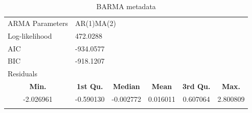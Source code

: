 \documentclass[12pt,a4paper,twoside]{article}
\begin{document}
\begin{longtable}{lccccc}
    \caption{BARMA metadata}\\
    \hline
    ARMA Parameters                   & \multicolumn{5}{l}{AR(1)MA(2)}                                                                     \\
    Log-likelihood                    & \multicolumn{5}{l}{472.0288}                                                                       \\
    AIC                               & \multicolumn{5}{l}{-934.0577}                                                                      \\
    BIC                               & \multicolumn{5}{l}{-918.1207}                                                                      \\
    \hline
    \multicolumn{6}{l}{Residuals}                                                                                                          \\
    \hline
    \multicolumn{1}{c}{\textbf{Min.}} & \textbf{1st Qu.}              & \textbf{Median} & \textbf{Mean} & \textbf{3rd Qu.} & \textbf{Max.} \\
    \hline
    \multicolumn{1}{c}{-2.026961}     & -0.590130                     & -0.002772       & 0.016011      & 0.607064         & 2.800809      \\
    \hline
    \label{tab:BARMAmetadata}
\end{longtable}
\newpage
\end{document}
